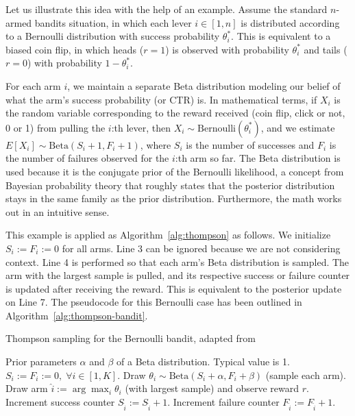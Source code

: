 \documentclass{article} %
\begin{document}
Let us illustrate this idea with the help of an example. Assume the standard
$n$-armed bandits situation, in which each lever $i \in [1,n]$ is distributed
according to a Bernoulli distribution with success probability $\theta^*_i$.
This is equivalent to a biased coin flip, in which heads ($r=1$) is observed
with probability $\theta^*_i$ and tails ($r=0$) with probability $1 -
\theta^*_i$.

For each arm $i$, we maintain a separate Beta distribution modeling our belief
of what the arm's success probability (or CTR) is. In mathematical terms, if
$X_i$ is the random variable corresponding to the reward received (coin flip,
click or not, 0 or 1) from pulling the $i$:th lever, then $X_i \sim
\text{Bernoulli}(\theta^*_i)$, and we estimate $E[X_i] \sim \text{Beta}(S_i +
1, F_i + 1)$, where $S_i$ is the number of successes and $F_i$ is the number of
failures observed for the $i$:th arm so far. The Beta distribution is used
because it is the conjugate prior of the Bernoulli likelihood, a concept from
Bayesian probability theory that roughly states that the posterior distribution
stays in the same family as the prior distribution. Furthermore, the math works
out in an intuitive sense.

This example is applied as Algorithm~\ref{alg:thompson} as follows. We
initialize $S_i := F_i := 0$ for all arms. Line 3 can be ignored because we are
not considering context. Line 4 is performed so that each arm's Beta
distribution is sampled.  The arm with the largest sample is pulled, and its
respective success or failure counter is updated after receiving the reward.
This is equivalent to the posterior update on Line 7.  The pseudocode for this
Bernoulli case has been outlined in Algorithm~\ref{alg:thompson-bandit}.

\begin{algorithm}[H]
  \caption{Thompson sampling for the Bernoulli bandit, adapted from \cite{chapelle2011empirical}}
  \label{alg:thompson-bandit}
  \begin{algorithmic}[1]
    \Require Prior parameters $\alpha$ and $\beta$ of a Beta distribution.
    Typical value is 1.
    \State $S_i := F_i := 0, \; \forall i \in [1,K]$.
      \State Draw $\theta_i \sim \text{Beta}(S_i + \alpha, F_i + \beta)$
      (sample each arm).
      \EndFor
      \State Draw arm $\hat{i} := \arg\max_{i} \theta_i$ (with largest sample) and observe reward $r$.
      \State Increment success counter $S_{\hat{i}} := S_{\hat{i}} + 1$.
      \Else
        \State Increment failure counter $F_{\hat{i}} := F_{\hat{i}} + 1$.
      \EndIf
    \EndFor
  \end{algorithmic}
\end{algorithm}
\end{document}
